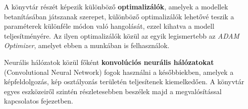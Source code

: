 \par A könyvtár részét képezik különböző \textbf{optimalizálók}, amelyek a modellek betanításában játszanak szerepet, különböző optimalizálók lehetővé teszik a paraméterek különféle módon való hangolását, ezzel kihatva a modell teljesítményére. Az ilyen optimalizálók közül az egyik legismertebb az \textit{ADAM Optimizer}, amelyet ebben a munkában is felhasználok.
\par Neurális hálózatok közül főként \textbf{konvolúciós neurális hálózatokat} (Convolutional Neural Network) fogok használni a későbbiekben, amelyek a képfeldolgozás, kép osztályozás területén teljesítenek kiemelkedően. A könyvtár egyes eszközeiről szintén részletesebben beszélek majd a megvalósítással kapcsolatos fejezetben.